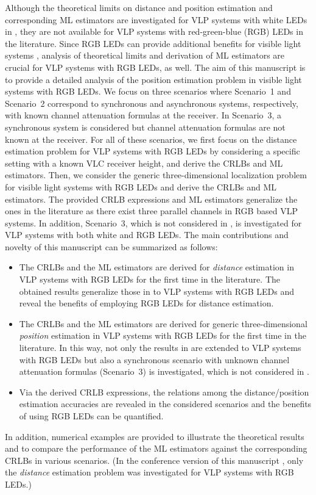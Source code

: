 \documentclass[10pt,twocolumn]{IEEEtran}
\begin{document}
Although the theoretical limits on distance and position estimation and corresponding ML estimators are investigated for VLP systems with white LEDs in \cite{CRB_TOA_VLC,VLP_CRLB_RSS,MFK_CRLB,IG_RSS_AOA_VLC,Erdal_CL_2015,Direct_TCOM}, they are not available for VLP systems with red-green-blue (RGB) LEDs in the literature. Since RGB LEDs can provide additional benefits for visible light systems \cite{ColorShiftKeying_JLT14,RGBref1}, analysis of theoretical limits and derivation of ML estimators are crucial for VLP systems with RGB LEDs, as well. The aim of this manuscript is to provide a detailed analysis of the position estimation problem in visible light systems with RGB LEDs. We focus on three scenarios where Scenario~1 and Scenario~2 correspond to synchronous and asynchronous systems, respectively, with known channel attenuation formulas at the receiver. In Scenario~3, a synchronous system is considered but channel attenuation formulas are not known at the receiver. For all of these scenarios, we first focus on the distance estimation problem for VLP systems with RGB LEDs by considering a specific setting with a known VLC receiver height, and derive the CRLBs and ML estimators. Then, we consider the generic three-dimensional localization problem for visible light systems with RGB LEDs and derive the CRLBs and ML estimators. The provided CRLB expressions and ML estimators generalize the ones in the literature \cite{MFK_CRLB,Direct_TCOM} as there exist three parallel channels in RGB based VLP systems. In addition, Scenario~3, which is not considered in \cite{Direct_TCOM}, is investigated for VLP systems with both white and RGB LEDs. The main contributions and novelty of this manuscript can be summarized as follows:
\begin{itemize}
  \item The CRLBs and the ML estimators are derived for \emph{distance} estimation in VLP systems with RGB LEDs for the first time in the literature. The obtained results generalize those in \cite{MFK_CRLB} to VLP systems with RGB LEDs and reveal the benefits of employing RGB LEDs for distance estimation.
  \item The CRLBs and the ML estimators are derived for generic three-dimensional \emph{position} estimation in VLP systems with RGB LEDs for the first time in the literature. In this way, not only the results in \cite{Direct_TCOM} are extended to VLP systems with RGB LEDs but also a synchronous scenario with unknown channel attenuation formulas (Scenario~3) is investigated, which is not considered in \cite{Direct_TCOM}.
  \item Via the derived CRLB expressions, the relations among the distance/position estimation accuracies are revealed in the considered scenarios and the benefits of using RGB LEDs can be quantified.
\end{itemize}
In addition, numerical examples are provided to illustrate the theoretical results and to compare the performance of the ML estimators against the corresponding CRLBs in various scenarios. (In the conference version of this manuscript \cite{IlkerPIMRC}, only the \emph{distance} estimation problem was investigated for VLP systems with RGB LEDs.)
\end{document}
